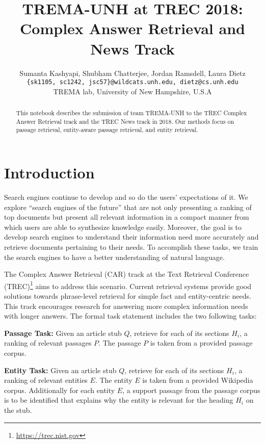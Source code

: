 \documentclass{article}
\title{TREMA-UNH at TREC 2018: Complex Answer Retrieval and News Track}
\author{Sumanta Kashyapi, Shubham Chatterjee, Jordan Ramsdell, Laura Dietz \\
\texttt{\{sk1105, sc1242, jsc57\}@wildcats.unh.edu, dietz@cs.unh.edu}\\
TREMA lab, University of New Hampshire, U.S.A}
\date{}
\begin{document}
\maketitle 

\begin{abstract}
This notebook describes the submission of team TREMA-UNH to the TREC Complex Answer Retrieval track and the TREC News track in 2018. Our methods focus on passage retrieval, entity-aware passage retrieval, and entity retrieval.
\end{abstract}





\section{Introduction}
\label{S:1}

Search engines continue to develop and so do the users' expectations of it. We explore ``search engines of the future'' that are not only presenting a ranking of top documents but present all relevant information in a compact manner from which users are able to synthesize knowledge easily. Moreover, the goal is to develop search engines to understand their information need more accurately and retrieve documents pertaining to their needs. To accomplish these tasks, we train the search engines to have a better understanding of natural language. 

The Complex Answer Retrieval (CAR)\cite{dietztrec} track at the Text Retrieval Conference (TREC)\footnote{\url{https://trec.nist.gov}} aims to address this scenario. Current retrieval systems provide good solutions towards phrase-level retrieval for simple fact and entity-centric needs. This track encourages research for answering more complex information needs with longer answers.
The formal task statement includes the two following tasks:

\noindent \textbf{Passage Task:} Given an article stub $Q$, retrieve for each of its sections $H_i$, a ranking of relevant passages $P$. The passage $P$ is taken from a provided passage corpus.

\noindent \textbf{Entity Task:} Given an article stub $Q$, retrieve for each of its sections $H_i$, a ranking of relevant entities $E$. The entity $E$ is taken from a provided Wikipedia corpus. Additionally for each entity $E$, a support passage from the passage corpus is to be identified that explains why the entity is relevant for the heading $H_i$ on the stub.
\medskip
\end{document}
